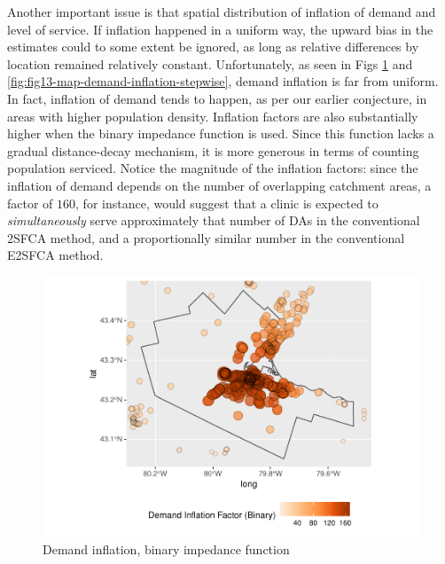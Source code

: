\documentclass[10pt,letterpaper]{article}
\begin{document}
Another important issue is that spatial distribution of inflation of
demand and level of service. If inflation happened in a uniform way, the
upward bias in the estimates could to some extent be ignored, as long as
relative differences by location remained relatively constant.
Unfortunately, as seen in Figs
\ref{fig:fig12-map-demand-inflation-binary} and
\ref{fig:fig13-map-demand-inflation-stepwise}, demand inflation is far
from uniform. In fact, inflation of demand tends to happen, as per our
earlier conjecture, in areas with higher population density. Inflation
factors are also substantially higher when the binary impedance function
is used. Since this function lacks a gradual distance-decay mechanism,
it is more generous in terms of counting population serviced. Notice the
magnitude of the inflation factors: since the inflation of demand
depends on the number of overlapping catchment areas, a factor of
\(160\), for instance, would suggest that a clinic is expected to
\emph{simultaneously} serve approximately that number of DAs in the
conventional 2SFCA method, and a proportionally similar number in the
conventional E2SFCA method.

\begin{figure}
\includegraphics[width=0.95\linewidth]{Supply_and_Demand_Inflation_in_FCA_Methods_v2.1_files/figure-latex/fig12-map-demand-inflation-binary-1} \caption{\label{fig:fig12-map-demand-inflation-binary}Demand inflation, binary impedance function}\label{fig:fig12-map-demand-inflation-binary}
\end{figure}
\end{document}
